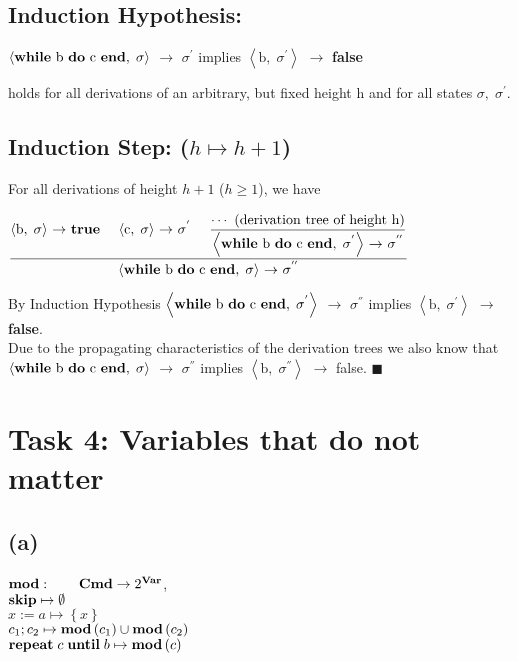 \documentclass[12pt,a4paper]{article}
\newcommand{\eRelation}[2]{$\dfrac{\text{#1}}{\text{#2}}$}
\newcommand{\eState}[2]{$\left< \text{#1},\; \text{#2}\right>$}
\newcommand{\eRule}[3]{\eState{#1}{#2} $\rightarrow$ #3}
\begin{document}
		\subsection*{Induction Hypothesis:}
		\begin{center}
			\eRule{\textbf{while} b \textbf{do} c \textbf{end}}{$\sigma$}{$\sigma ^{'}$} implies \eRule{b}{$\sigma ^{'}$}{\textbf{false}}
		\end{center}
		\indent\indent holds for all derivations of an arbitrary, but fixed height h and for all states \indent$\sigma , \; \sigma ^{'}$.\\
		\subsection*{Induction Step: ($h\mapsto h+1$)}
		\indent\indent For all derivations of height $h+1$ ($h\geq 1$), we have\\
		\begin{center}
			\eRelation
				{\eRule{b}{$\sigma$}{\textbf{true}} \quad \eRule{c}{$\sigma$}{$\sigma ^{'}$} \quad \eRelation{$\cdots$ (derivation tree of height h)}{\eRule{\textbf{while} b \textbf{do} c \textbf{end}}{$\sigma ^{'}$}{$\sigma ^{''}$}}}
				{\eRule{\textbf{while} b \textbf{do} c \textbf{end}}{$\sigma$}{$\sigma ^{''}$}}
		\end{center}
		\indent\indent By Induction Hypothesis \eRule{\textbf{while} b \textbf{do} c \textbf{end}}{$\sigma ^{'}$}{$\sigma ^{''}$} implies \eRule{b}{$\sigma ^{'}$}{\textbf{false}}.\\
		\indent Due to the propagating characteristics of the derivation trees we also know \indent that \eRule{\textbf{while} b \textbf{do} c \textbf{end}}{$\sigma$}{$\sigma ^{''}$} implies \eRule{b}{$\sigma ^{''}$}{false}. \qquad $\blacksquare$
	\section*{Task 4: Variables that do not matter}
	
	\subsection*{(a)}
	
	\indent\indent $\text{\textbf{mod}}: \qquad \text{\textbf{Cmd}}\rightarrow 2^{\text{\textbf{Var}}}$,\\
	\indent $\text{\textbf{skip}}\mapsto\emptyset$\\
	\indent $x:=a\mapsto \left\lbrace x \right\rbrace$\\
	\indent $c_1;c_2\mapsto \text{\textbf{mod}}\left( c_1\right) \cup\text{\textbf{mod}}\left( c_2\right)$\\
	\indent $\text{\textbf{repeat}}\; c\; \text{\textbf{until}}\; b \mapsto \text{\textbf{mod}}\left( c\right)$\\
	
\end{document}
